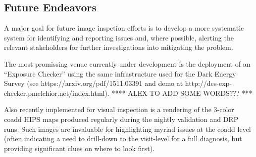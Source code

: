 \subsection{Future Endeavors}

A major goal for future image inspction efforts is to develop a more systematic
system for identifying and reporting issues and, where possible, alerting the
relevant stakeholders for further investigations into mitigating the problem.

The most promissing venue currently under development is the deployment of an
``Exposure Checker'' using the same infrastructure used for the Dark Energy Survey
(see https://arxiv.org/pdf/1511.03391 and demo at
http://des-exp-checker.pmelchior.net/index.html).
**** ALEX TO ADD SOME WORDS??? ***

Also recently implemented for visual inspection is a rendering of the 3-color coadd
HIPS maps produced regularly during the nightly validation and DRP runs.  Such images
are invaluable for highlighting myriad issues at the coadd level (often indicating a
need to drill-down to the visit-level for a full diagnosis, but providing significant
clues on where to look first).
